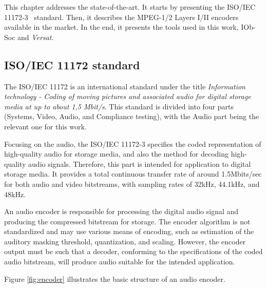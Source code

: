  

This chapter addresses the state-of-the-art. It starts by presenting the ISO/IEC 11172-3~\cite{11172} standard. Then, it describes the MPEG-1/2 Layers I/II encoders available in the market. In the end, it presents the tools used in this work, IOb-Soc and \textit{Versat}.

\subsection{ISO/IEC 11172 standard}

The ISO/IEC 11172 is an international standard under the title \textit{Information technology - Coding of moving pictures and associated audio for digital storage media at up to about 1,5 Mbit/s}. This standard is divided into four parts (Systems, Video, Audio, and Compliance testing), with the Audio part being the relevant one for this work.

Focusing on the audio, the ISO/IEC 11172-3 specifies the coded representation of high-quality audio for storage media, and also the method for decoding high-quality audio signals. 
Therefore, this part is intended for application to digital storage media. It provides a total continuous transfer rate of around 1.5Mbits/sec for both audio and video bitstreams, with sampling rates of 32kHz, 44.1kHz, and 48kHz.

An audio encoder is responsible for processing the digital audio signal and producing the compressed bitstream for storage. 
The encoder algorithm is not standardized and may use various means of encoding, such as estimation of the auditory masking threshold, quantization, and scaling. However, the encoder output must be such that a decoder, conforming to the specifications of the coded audio bitstream, will produce audio suitable for the intended application.

Figure \ref{fig:encoder} illustrates the basic structure of an audio encoder. 

